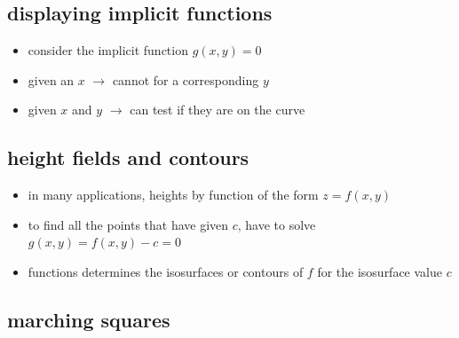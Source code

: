 \documentclass[11pt,a4paper]{article}
\begin{document}
\subsection{displaying implicit functions}
\begin{itemize}
	\item consider the implicit function $g(x,y)=0$
	\item given an $x$ $\rightarrow$ cannot for a corresponding  $y$
	\item given $x$ and $y$ $\rightarrow$ can test if they are on the curve
\end{itemize}
\subsection{height fields and contours}
\begin{itemize}
	\item in many applications, heights by function of the form $z=f(x,y)$
	\item to find all the points that have given $c$, have to solve $g(x,y)=f(x,y)-c=0$
	\item functions determines the isosurfaces or contours of $f$ for the isosurface value $c$
\end{itemize}
\subsection{marching squares}
\end{document}
